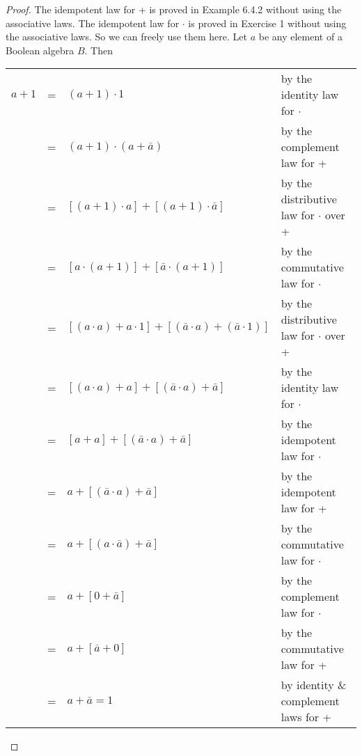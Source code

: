 \documentclass[14pt]{extarticle}
\newcommand{\cy}{\color{cyan}}
\begin{document}
\begin{proof}
  The idempotent law for + is proved in Example 6.4.2 without using the associative laws. The idempotent law for $\cdot$
  is proved in Exercise 1 without using the associative laws. So we can freely use them here.
  Let $a$ be any element of a Boolean algebra $B$. Then
  \begin{center}
    \begin{tabular}{rcll}
      \(a + 1\) & = & \((a + 1) \cdot 1\)                                                    & {\cy by the identity law for $\cdot$}            \\
                & = & \((a + 1) \cdot (a + \bar{a})\)                                        & {\cy by the complement law for +}                \\
                & = & \([(a + 1) \cdot a] + [(a + 1) \cdot \bar{a}]\)                        & {\cy by the distributive law for $\cdot$ over +} \\
                & = & \([a \cdot (a + 1)] + [\bar{a} \cdot (a + 1)]\)                        & {\cy by the commutative law for $\cdot$}         \\
                & = & \([(a \cdot a) + a \cdot 1] + [(\bar{a}\cdot a) + (\bar{a}\cdot 1) ]\) &
      {\cy by the distributive law for $\cdot$ over +}                                                                                          \\
                & = & \([(a \cdot a) + a] + [(\bar{a}\cdot a) + \bar{a}]\)                   & {\cy by the identity law for $\cdot$}            \\
                & = & \([a + a] + [(\bar{a}\cdot a) + \bar{a}]\)                             & {\cy by the idempotent law for $\cdot$}          \\
                & = & \(a + [(\bar{a}\cdot a) + \bar{a}]\)                                   & {\cy by the idempotent law for +}                \\
                & = & \(a + [(a \cdot \bar{a}) + \bar{a}]\)                                  & {\cy by the commutative law for $\cdot$}         \\
                & = & \(a + [0 + \bar{a}]\)                                                  & {\cy by the complement law for $\cdot$}          \\
                & = & \(a + [\bar{a} + 0]\)                                                  & {\cy by the commutative law for +}               \\
                & = & \(a + \bar{a} = 1\)                                                    & {\cy by identity \& complement laws for +}
    \end{tabular}
  \end{center}
\end{proof}
\end{document}
